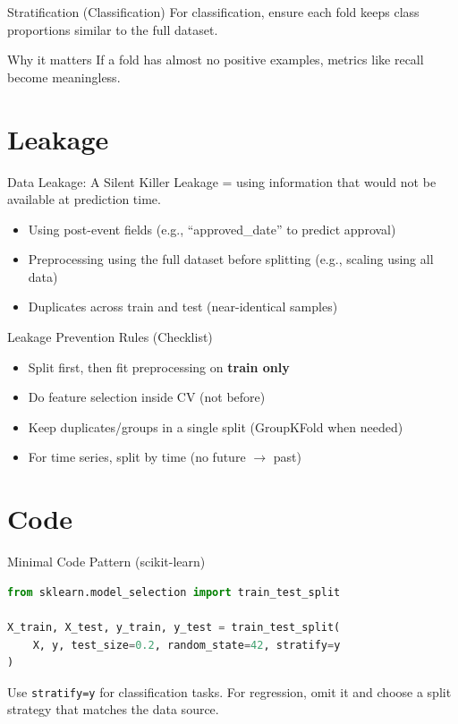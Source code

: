\documentclass[aspectratio=169]{beamer}
\begin{document}
\begin{frame}{Stratification (Classification)}
  For classification, ensure each fold keeps class proportions similar to the full dataset.
  \vspace{0.4em}
  \begin{exampleblock}{Why it matters}
    If a fold has almost no positive examples, metrics like recall become meaningless.
  \end{exampleblock}
\end{frame}

\section{Leakage}
\label{sec:leak}

\begin{frame}{Data Leakage: A Silent Killer}
  Leakage = using information that would not be available at prediction time.
  \vspace{0.4em}
  \begin{itemize}[<+->]
    \item Using post-event fields (e.g., ``approved\_date'' to predict approval)
    \item Preprocessing using the full dataset before splitting (e.g., scaling using all data)
    \item Duplicates across train and test (near-identical samples)
  \end{itemize}
\end{frame}

\begin{frame}{Leakage Prevention Rules (Checklist)}
  \begin{itemize}[<+->]
    \item Split first, then fit preprocessing on \textbf{train only}
    \item Do feature selection inside CV (not before)
    \item Keep duplicates/groups in a single split (GroupKFold when needed)
    \item For time series, split by time (no future $\rightarrow$ past)
  \end{itemize}
\end{frame}

\section{Code}
\label{sec:code}

\begin{frame}[fragile]{Minimal Code Pattern (scikit-learn)}
  \begin{lstlisting}[language=Python]
from sklearn.model_selection import train_test_split

X_train, X_test, y_train, y_test = train_test_split(
    X, y, test_size=0.2, random_state=42, stratify=y
)
  \end{lstlisting}
  \vspace{0.3em}
  \small Use \texttt{stratify=y} for classification tasks. For regression, omit it and choose a split strategy that matches the data source.
\end{frame}
\end{document}
